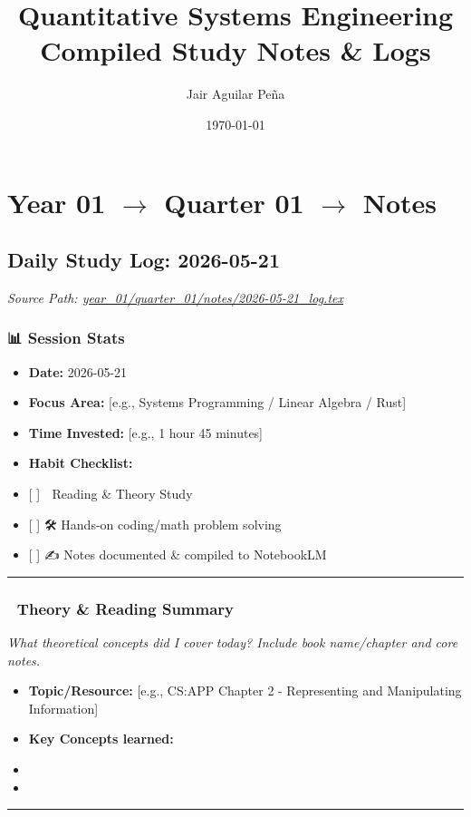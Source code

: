 \documentclass[11pt,a4paper]{report}
\title{Quantitative Systems Engineering\\ \large Compiled Study Notes \& Logs}
\author{Jair Aguilar Peña}
\date{\today}
\begin{document}
\maketitle
\tableofcontents
\newpage

\chapter{Year 01 $\rightarrow$ Quarter 01 $\rightarrow$ Notes}
\section{Daily Study Log: 2026-05-21}
\noindent\textit{Source Path: \href{https://github.com/TEGDV/QuantitativeSystemsEngineering/blob/main/year_01/quarter_01/notes/2026-05-21_log.tex}{year\_01/quarter\_01/notes/2026-05-21\_log.tex}}\\


\subsection{📊 Session Stats}
\begin{itemize}
  \item \textbf{Date:} 2026-05-21
  \item \textbf{Focus Area:} [e.g., Systems Programming / Linear Algebra / Rust]
  \item \textbf{Time Invested:} [e.g., 1 hour 45 minutes]
  \item \textbf{Habit Checklist:}
  \item {[ ]} 📖 Reading \& Theory Study
  \item {[ ]} 🛠️ Hands-on coding/math problem solving
  \item {[ ]} ✍️ Notes documented \& compiled to NotebookLM

\end{itemize}
\noindent\rule{\textwidth}{0.4pt}

\subsection{📖 Theory \& Reading Summary}
\textit{What theoretical concepts did I cover today? Include book name/chapter and core notes.}

\begin{itemize}
  \item \textbf{Topic/Resource:} [e.g., CS:APP Chapter 2 - Representing and Manipulating Information]
  \item \textbf{Key Concepts learned:}
  \item 
  \item 

\end{itemize}
\noindent\rule{\textwidth}{0.4pt}
\end{document}
